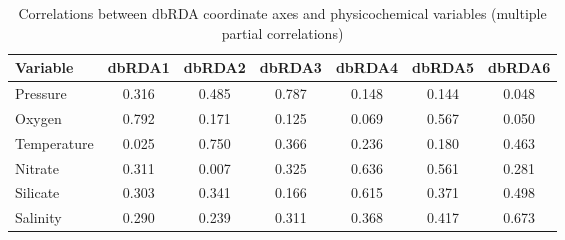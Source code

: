 \begin{table}[!ht]
\caption[Correlations between dbRDA axes and physicochemical variables]{Correlations between dbRDA coordinate axes and physicochemical variables (multiple partial correlations)}
\label{tab:dbRDAcorrs}
\smallskip
\begin{center}
\begin{tabular}{lS[table-format=3.2]S[table-format=3.2]S[table-format=3.2]S[table-format=3.2]S[table-format=3.2]S[table-format=3.2]}%
\toprule
\textbf{Variable} & \textbf{dbRDA1} & \textbf{dbRDA2} & \textbf{dbRDA3} & \textbf{dbRDA4} & \textbf{dbRDA5} & \textbf{dbRDA6}\\
\midrule
Pressure & \textminus{}0.316 & \textminus{}0.485 & \textminus{}0.787 & \textminus{}0.148 & \textminus{}0.144 & \textminus{}0.048\\
Oxygen & 0.792 & \textminus{}0.171 & \textminus{}0.125 & 0.069 & \textminus{}0.567 & 0.050\\
Temperature & \textminus{}0.025 & \textminus{}0.750 & 0.366 & 0.236 & 0.180 & 0.463\\
Nitrate & \textminus{}0.311 & 0.007 & 0.325 & \textminus{}0.636 & \textminus{}0.561 & 0.281\\
Silicate & \textminus{}0.303 & 0.341 & \textminus{}0.166 & 0.615 & \textminus{}0.371 & 0.498\\
Salinity & \textminus{}0.290 & \textminus{}0.239 & 0.311 & 0.368 & \textminus{}0.417 & \textminus{}0.673\\
\bottomrule
\end{tabular}
\end{center}
\end{table}
